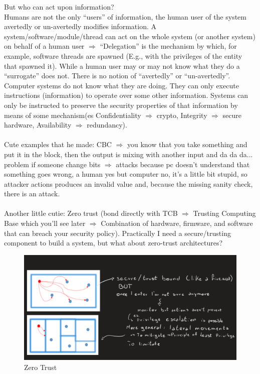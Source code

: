 But who can act upon information?
\\Humans are not the only “users” of information, the human user of the system avertedly or un-avertedly modifies information. A system/software/module/thread can act on the whole system (or another system) on behalf of a human user $\Rightarrow$ “Delegation” is the mechanism by which, for example, software threads are spawned (E.g., with the privileges of the entity that spawned it). While a human user may or may not know what they do a “surrogate” does not. There is no notion of “avertedly” or “un-avertedly”.
Computer systems do not know what they are doing. They can only execute instructions (information) to operate over some other information. Systems can only be instructed to preserve the security properties of that information by means of some mechanism(es Confidentiality $\Rightarrow$ crypto, Integrity $\Rightarrow$ secure hardware, Availability $\Rightarrow$ redundancy).
\\\\Cute examples that he made: CBC $\Rightarrow$ you know that you take something and put it in the block, then the output is mixing with another input and da da da... problem if someone change bits $\Rightarrow$ attacks because pc doesn’t understand that something goes wrong, a human yes but computer no, it’s a little bit stupid, so attacker actions produces an invalid value and, because the missing sanity check, there is an attack.
\\\\Another little cutie: Zero trust (bond directly with TCB $\Rightarrow$ Trusting Computing Base which you'll see later $\Rightarrow$ Combination of hardware, firmware, and software that can breach your security policy).
Practically I need a secure/trusting component to build a system, but what about zero-trust architectures?
\begin{figure}[h]
    \centering
    \includegraphics[scale=0.5]{Figures/ZeroTrust.png}
    \caption{Zero Trust}
\end{figure}
